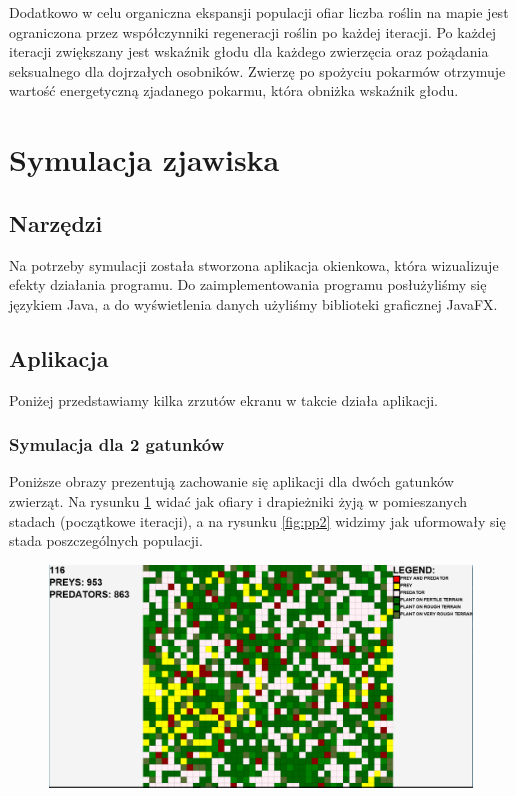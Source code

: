 Dodatkowo w celu organiczna ekspansji populacji ofiar liczba roślin na mapie jest ograniczona przez współczynniki regeneracji roślin po każdej iteracji. Po każdej iteracji zwiększany jest wskaźnik głodu dla każdego zwierzęcia oraz pożądania seksualnego dla dojrzałych osobników. Zwierzę po spożyciu pokarmów otrzymuje wartość energetyczną zjadanego pokarmu, która obniżka wskaźnik głodu.

\section{Symulacja zjawiska}

\subsection{Narzędzi}
Na potrzeby symulacji została stworzona aplikacja okienkowa, która wizualizuje efekty działania programu.
Do zaimplementowania programu posłużyliśmy się językiem Java, a do wyświetlenia danych użyliśmy biblioteki graficznej JavaFX.
\subsection{Aplikacja}
Poniżej przedstawiamy kilka zrzutów ekranu w takcie działa aplikacji.
\subsubsection{Symulacja dla 2 gatunków}
Poniższe obrazy prezentują zachowanie się aplikacji dla dwóch gatunków zwierząt. Na rysunku \ref{fig:pp1} widać jak ofiary i drapieżniki żyją w pomieszanych stadach (początkowe iteracji), a na rysunku \ref{fig:pp2} widzimy jak uformowały się stada poszczególnych populacji.

\begin{figure}[H]
	\centering
	\includegraphics[width=1.0\linewidth]{img/tii1}
	\caption{\label{fig:pp1} }
\end{figure}

